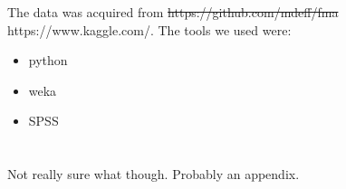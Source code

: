 \documentclass[12pt,a4paper]{article}
\begin{document}
    The data was acquired from \st{https://github.com/mdeff/fma} https://www.kaggle.com/.
    \newline \newline
    The tools we used were:

    \begin{itemize}
        \item python
        \item weka
        \item SPSS
    \end{itemize}
    \appendix
    \section{}
    Not really sure what though. Probably an appendix.
\end{document}
